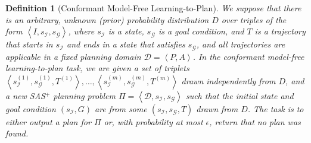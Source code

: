 \documentclass[letterpaper]{article}
\newtheorem{definition}{Definition}
\newcommand{\tuple}[1]{\ensuremath{\left \langle #1 \right \rangle }}
\newcommand{\SAS}{SAS$^+$}
\begin{document}
\begin{definition}[Conformant Model-Free Learning-to-Plan] We suppose that there is an arbitrary, unknown (prior) probability distribution $D$ over triples of the form $\tuple{I,s_\mathcal{I}, s_\mathcal{G}}$, where $s_\mathcal{I}$ is a state, $s_\mathcal{G}$ is a goal condition, and $T$ is a trajectory that starts in $s_\mathcal{I}$ and ends in a state that satisfies $s_\mathcal{G}$, 
and all trajectories are applicable in a fixed planning domain $\mathcal{D}=\tuple{P,A}$. 
In the conformant model-free learning-to-plan task, we are given a set of triplets $\tuple{s_\mathcal{I}^{(1)},s_\mathcal{G}^{(1)},T^{(1)}},\ldots,\tuple{s_\mathcal{I}^{(m)},s_\mathcal{G}^{(m)},T^{(m)}}$ drawn independently from $D$, 
and a new \SAS{} planning problem $\Pi=\tuple{\mathcal{D}, s_\mathcal{I}, s_\mathcal{G}}$  
such that the initial state and goal condition $(s_\mathcal{I},G)$ are from some $(s_\mathcal{I},s_\mathcal{G},T)$ drawn from $D$. 
The task is to either output a plan for $\Pi$ or, with probability at most $\epsilon$, return that no plan was found.
\label{def:learning-to-plan}
\end{definition}
\end{document}
